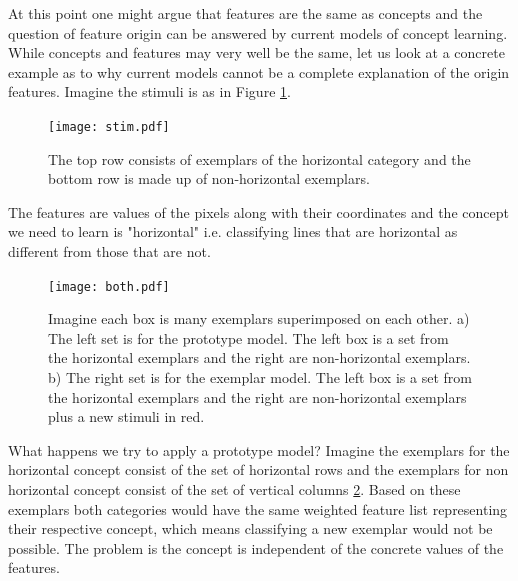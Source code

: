 \documentclass[doc]{apa}%
\begin{document}
At this point one might argue that features are the same as concepts
\cite{schyns98} and the question of feature origin can be answered
by current models of concept learning.  While concepts and features
may very well be the same, let us look at a concrete example as to why
current models cannot be a complete explanation of the origin
features.  Imagine the stimuli is as in Figure \ref{fig:stim}. 
\begin{figure}[htbp]
\begin{center}
\texttt{[image: stim.pdf]}
\caption{The top row consists of exemplars of the horizontal category
  and the bottom row is made up of non-horizontal exemplars. }
\label{fig:stim}
\end{center}
\end{figure}
The features are values of the pixels along with their coordinates and the concept we
need to learn is "horizontal" i.e. classifying lines that are
horizontal as different from those that are not.  
\begin{figure}[htbp]
\begin{center}
\texttt{[image: both.pdf]}
\caption{Imagine each box is many exemplars superimposed on each
  other. a) The left set is for the prototype model. The left box is a set from the horizontal exemplars and the
  right are non-horizontal exemplars. b) The right set is for the
  exemplar model.  The left box is a set from the horizontal exemplars and the
  right are non-horizontal exemplars plus a new stimuli in red. }
\label{fig:both}
\end{center}
\end{figure}
What happens we try to apply a prototype model?  Imagine the exemplars for the horizontal
concept consist of the set of horizontal rows and the exemplars for
non horizontal concept consist of the set of vertical columns \ref{fig:both}.
  Based on these exemplars both categories would have the same weighted
feature list representing their respective concept, which means
classifying a new exemplar would not be possible.  The problem is the
concept is independent of the concrete values of the features. 
\end{document}
